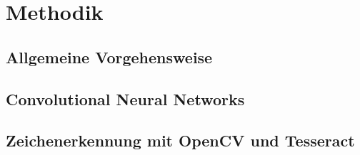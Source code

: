 \section{Methodik}
\label{sec:methodik}

\subsection{Allgemeine Vorgehensweise}

\subsection{Convolutional Neural Networks}

\subsection{Zeichenerkennung mit OpenCV und Tesseract}